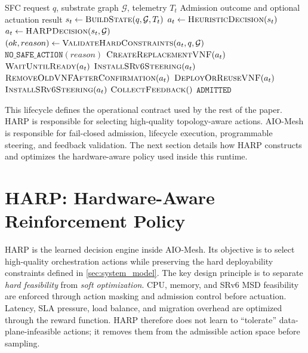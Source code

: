 \documentclass[final,5p]{elsarticle}
\begin{document}
\begin{algorithm}[t]
\caption{AIO-Mesh request lifecycle}
\label{alg:aio_mesh_lifecycle}
\begin{algorithmic}[1]
\Require SFC request \(q\), substrate graph \(\mathcal{G}\), telemetry \(T_t\)
\Ensure Admission outcome and optional actuation result
\State \(s_t \gets \textsc{BuildState}(q,\mathcal{G},T_t)\)
    \State \(a_t \gets \textsc{HeuristicDecision}(s_t)\)
\Else
    \State \(a_t \gets \textsc{HARPDecision}(s_t,\mathcal{G})\)
\EndIf
\State \((ok, reason) \gets \textsc{ValidateHardConstraints}(a_t,q,\mathcal{G})\)
    \State \Return \(\texttt{NO\_SAFE\_ACTION}(reason)\)
\EndIf
{}
    \State \(\textsc{CreateReplacementVNF}(a_t)\)
    \State \(\textsc{WaitUntilReady}(a_t)\)
    \State \(\textsc{InstallSRv6Steering}(a_t)\)
    \State \(\textsc{RemoveOldVNFAfterConfirmation}(a_t)\)
\Else
    \State \(\textsc{DeployOrReuseVNF}(a_t)\)
    \State \(\textsc{InstallSRv6Steering}(a_t)\)
\EndIf
\State \(\textsc{CollectFeedback}()\)
\State \Return \(\texttt{ADMITTED}\)
\end{algorithmic}
\end{algorithm}

This lifecycle defines the operational contract used by the rest of the paper. HARP is responsible for selecting high-quality topology-aware actions. AIO-Mesh is responsible for fail-closed admission, lifecycle execution, programmable steering, and feedback validation. The next section details how HARP constructs and optimizes the hardware-aware policy used inside this runtime.


\section{HARP: Hardware-Aware Reinforcement Policy}
\label{sec:harp}

HARP is the learned decision engine inside AIO-Mesh. Its objective is to select high-quality orchestration actions while preserving the hard deployability constraints defined in \autoref{sec:system_model}. The key design principle is to separate \emph{hard feasibility} from \emph{soft optimization}. CPU, memory, and SRv6 MSD feasibility are enforced through action masking and admission control before actuation. Latency, SLA pressure, load balance, and migration overhead are optimized through the reward function. HARP therefore does not learn to ``tolerate'' data-plane-infeasible actions; it removes them from the admissible action space before sampling.
\end{document}
